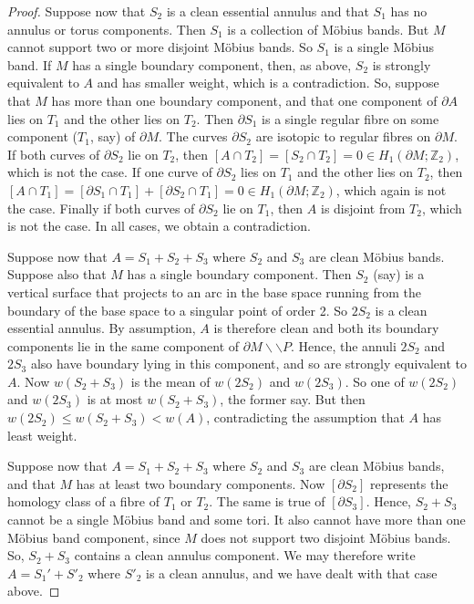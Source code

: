 \documentclass[10pt,a4paper]{amsart}
\newcommand{\cut}{\backslash\backslash}
\begin{document}
\begin{proof}
Suppose now that $S_2$ is a clean essential annulus and that $S_1$ has no annulus or torus components.
Then $S_1$ is a collection of M\"obius bands. But $M$ cannot support two or more disjoint M\"obius bands.
So $S_1$ is a single M\"obius band.
If $M$ has a single boundary component, then, as above, $S_2$ is strongly equivalent to $A$ and has smaller
weight, which is a contradiction. So, suppose that $M$ has more than one boundary component,
and that one component of $\partial A$ lies on $T_1$ and the other lies on $T_2$.
Then $\partial S_1$ is a single regular fibre on some component ($T_1$, say) of
$\partial M$. The curves $\partial S_2$ are isotopic to regular fibres on $\partial M$.
If both curves of $\partial S_2$ lie on $T_2$, then $[A \cap T_2] = [S_2 \cap T_2] = 0 \in H_1(\partial M; \mathbb{ Z}_2)$,
which is not the case. If one curve of $\partial S_2$ lies on $T_1$ and the other lies on $T_2$,
then $[A \cap T_1] = [\partial S_1 \cap T_1] + [\partial S_2 \cap T_1] = 0 \in H_1(\partial M; \mathbb{ Z}_2)$, which 
again is not the case.
Finally if both curves of $\partial S_2$ lie on $T_1$, then $A$ is disjoint from $T_2$, which is not the case.
In all cases, we obtain a contradiction.

Suppose now that $A = S_1 + S_2 + S_3$ where $S_2$ and $S_3$ are clean M\"obius bands. Suppose
also that $M$ has a single boundary component.
Then $S_2$ (say) is a vertical surface that projects to an arc in the base space running from
the boundary of the base space to a singular point of order 2. So $2 S_2$ is a clean essential annulus.
By assumption, $A$ is therefore clean and both its boundary components lie in the
same component of $\partial M \cut P$. Hence, the annuli $2S_2$ and $2S_3$
also have boundary lying in this component, and so are strongly equivalent to $A$.
Now $w(S_2 + S_3)$ is the mean of $w(2S_2)$ and $w(2S_3)$.
So one of $w(2S_2)$ and $w(2S_3)$ is at most $w(S_2 + S_3)$, the former say. But
then $w(2S_2) \leq w(S_2 + S_3) < w(A)$, contradicting the assumption that $A$ has least weight.

Suppose now that $A = S_1 + S_2 + S_3$ where $S_2$ and $S_3$ are clean M\"obius bands, and that
$M$ has at least two boundary components. Now $[\partial S_2]$ represents the homology class
of a fibre of $T_1$ or $T_2$. The same is true of $[\partial S_3]$. Hence, $S_2 + S_3$
cannot be a single M\"obius band and some tori. It also cannot have more than one
M\"obius band component, since $M$ does not support two disjoint M\"obius bands.
So, $S_2 + S_3$ contains a clean annulus component. We may therefore write $A = S_1' + S'_2$
where $S'_2$ is a clean annulus, and we have dealt with that case above.

\end{proof}
\end{document}
